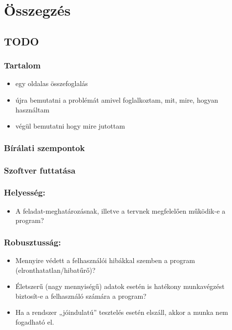 \chapter{Összegzés} %
\label{ch:sum}

\section{TODO}
\subsection{Tartalom}
\begin{itemize}
    \item egy oldalas összefoglalás
	\item újra bemutatni a problémát amivel foglalkoztam, mit, mire, hogyan használtam
	\item végül bemutatni hogy mire jutottam
\end{itemize}

\subsection{Bírálati szempontok}
\subsection{Szoftver futtatása}
\subsection{Helyesség:}
\begin{itemize}
    \item A feladat-meghatározásnak, illetve a tervnek megfelelően működik-e a program?
\end{itemize}
\subsection{Robusztusság:}
\begin{itemize}
    \item Mennyire védett a felhasználói hibákkal szemben a program (elronthatatlan/hibatűrő)?
    \item Életszerű (nagy mennyiségű) adatok esetén is hatékony munkavégzést biztosít-e a felhasználó számára a program?
    \item Ha a rendszer „jóindulatú” tesztelés esetén elszáll, akkor a munka nem fogadható el.
\end{itemize}
